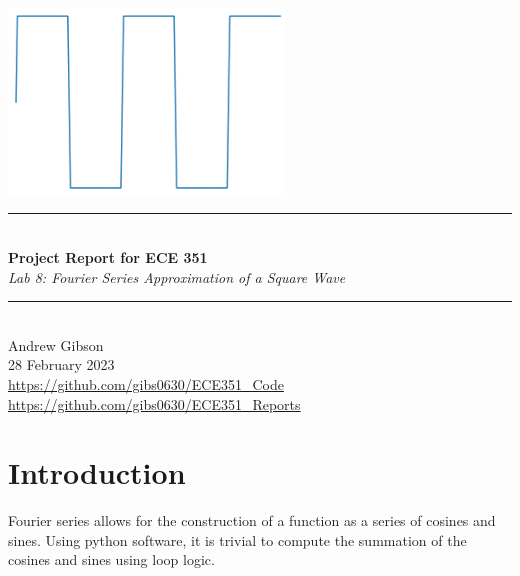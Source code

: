 \documentclass[12pt,a4paper]{article}
\newcommand{\HRule}{\rule{\linewidth}{0.5mm}}
\begin{document}
\begin{titlepage}
\begin{center}
\includegraphics[width=0.55\textwidth]{titlepage_image.png}~\\[2cm]
\HRule \\[0.4cm]
{ \LARGE 
  \textbf{Project Report for ECE 351}\\[0.4cm]
  \emph{Lab 8: Fourier Series Approximation of a Square Wave}\\[0.4cm]
}
\HRule \\[1.5cm]
{ \large
  Andrew Gibson \\[0.1cm]
 28 February 2023\\[0.1cm]
  \url{https://github.com/gibs0630/ECE351\_Code}\\[0.1cm]
  \url{https://github.com/gibs0630/ECE351\_Reports}\\[0.1cm]
}
\vfill
{\large }
 
\end{center}
\end{titlepage}
\newpage
\tableofcontents
{}
\newpage
\setcounter{page}{1}
\section{Introduction}\label{sec:intro}
Fourier series allows for the construction of a function as a series of cosines and sines. Using python software, it is trivial to compute the summation of the cosines and sines using loop logic.
\end{document}

